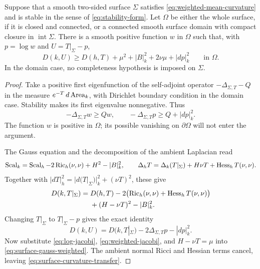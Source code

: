 \begin{lemma}
\label{lem:weighted-stability}
Suppose that a smooth two-sided surface $\Sigma$ satisfies
\eqref{eq:weighted-mean-curvature} and is stable in the sense of
\eqref{eq:stability-form}.  Let $\Omega$ be either the whole surface,
if it is closed and connected, or a connected smooth surface domain
with compact closure in $\operatorname{int}\Sigma$.  There is a smooth
positive function $w$ in $\Omega$ such that, with $p=\log w$ and
$U=T|_\Sigma-p$,
\begin{equation}\label{eq:surface-curvature-transfer}
 D(k,U)\ge
 D(h,T)+\mu^2+|B|_k^2+2\nu\mu+|dp|_k^2
 \qquad\text{in }\Omega.
\end{equation}
In the domain case, no completeness hypothesis is imposed on $\Sigma$.
\end{lemma}

\begin{proof}
Take a positive first eigenfunction of the self-adjoint operator
$-\Delta_{\Sigma,T}-Q$ in the measure $e^{-T}\,d\operatorname{Area}_k$, with
Dirichlet boundary condition in the domain case.  Stability makes its
first eigenvalue nonnegative.  Thus
\begin{equation}\label{eq:log-jacobi}
 -\Delta_{\Sigma,T}w\ge Qw,
 \qquad
 -\Delta_{\Sigma,T}p\ge Q+|dp|_k^2.
\end{equation}
The function $w$ is positive in $\Omega$; its possible vanishing on
$\partial\Omega$ will not enter the argument.

The Gauss equation and the decomposition of the ambient Laplacian read
\[
 \operatorname{Scal}_k=\operatorname{Scal}_h-2\operatorname{Ric}_h(\nu,\nu)+H^2-|B|_k^2,
 \qquad
 \Delta_hT=\Delta_k(T|_\Sigma)+H\nu T+\operatorname{Hess}_hT(\nu,\nu).
\]
Together with $|dT|_h^2=|d(T|_\Sigma)|_k^2+(\nu T)^2$, these give
\begin{equation}\label{eq:surface-gauss-weighted}
 \begin{split}
 D(k,T|_\Sigma)={}&D(h,T)
 -2\bigl(\operatorname{Ric}_h(\nu,\nu)+\operatorname{Hess}_hT(\nu,\nu)\bigr)\\
 &+(H-\nu T)^2-|B|_k^2.
 \end{split}
\end{equation}
Changing $T|_\Sigma$ to $T|_\Sigma-p$ gives the exact identity
\[
 D(k,U)=D(k,T|_\Sigma)-2\Delta_{\Sigma,T}p-|dp|_k^2.
\]
Now substitute \eqref{eq:log-jacobi},
\eqref{eq:weighted-jacobi}, and $H-\nu T=\mu$ into
\eqref{eq:surface-gauss-weighted}.  The ambient normal Ricci and Hessian
terms cancel, leaving \eqref{eq:surface-curvature-transfer}.
\end{proof}

